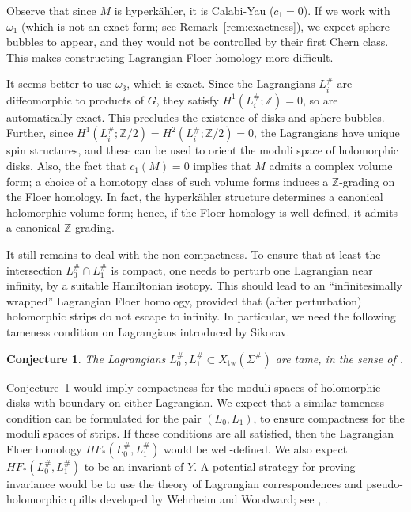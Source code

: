 \documentclass [11pt]{amsart}
\newtheorem {conjecture}[theorem]{Conjecture}
\theoremstyle{remark}
\def\zz {{\mathbb{Z}}}
\def\Z {\zz}
\def\HF {\mathit{HF}}
\def\Char {X}
\def\Xtw{\Char_{\operatorname{tw}}}
\begin{document}
Observe that since $M$ is hyperk\"ahler, it is Calabi-Yau ($c_1=0$). If we work with $\omega_1$ (which is not an exact form; see Remark~\ref{rem:exactness}), we expect sphere bubbles to appear, and they would not be controlled by their first Chern class. This makes constructing Lagrangian Floer homology more difficult. 

It seems better to use $\omega_3$, which is exact. Since the Lagrangians $L_i^{\#}$ are diffeomorphic to products of $G$, they satisfy $H^1(L_i^{\#}; \Z)=0$, so are automatically exact. This precludes the existence of disks and sphere bubbles. Further, since $H^1(L_i^{\#}; \Z/2)=H^2(L_i^{\#}; \Z/2)=0$, the Lagrangians have unique spin structures, and these can be used to orient the moduli space of holomorphic disks. Also, the fact that $c_1(M)=0$ implies that $M$ admits a complex volume form; a choice of a homotopy class of such volume forms induces a $\Z$-grading on the Floer homology. In fact, the  hyperk\"ahler structure determines a canonical holomorphic volume form; hence, if the Floer homology is well-defined, it admits a canonical $\Z$-grading. 

It still remains to deal with the non-compactness. To ensure that at least the intersection $L_0^{\#} \cap L_1^{\#}$ is compact, one needs to perturb one Lagrangian near infinity, by a suitable Hamiltonian isotopy. This should lead to an ``infinitesimally wrapped'' Lagrangian Floer homology, provided that (after perturbation) holomorphic strips do not escape to infinity. In particular, we need the following tameness condition on Lagrangians introduced by Sikorav.

\begin{conjecture}
\label{conj:tame}
The Lagrangians $L^{\#}_0, L^{\#}_1 \subset \Xtw(\Sigma^{\#})$ are tame, in the sense of \cite[Definition 4.7.1]{Sikorav}.
\end{conjecture}

Conjecture~\ref{conj:tame} would imply compactness for the moduli spaces of holomorphic disks with boundary on either Lagrangian. We expect that a similar tameness condition can be formulated for the pair $(L_0, L_1)$, to ensure compactness for the moduli spaces of strips.  If these conditions are all satisfied, then the Lagrangian Floer homology $\HF_*(L^{\#}_0, L^{\#}_1)$ would be well-defined. We also expect $\HF_*(L^{\#}_0, L^{\#}_1)$ to be an invariant of $Y$. A potential strategy for proving invariance would be to use the theory of Lagrangian correspondences and pseudo-holomorphic quilts developed by Wehrheim and Woodward; see \cite{WWFunctoriality}, \cite{WWFloerField}. 
 
\end{document}
